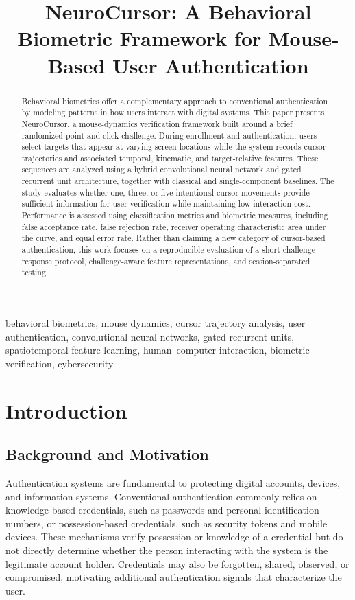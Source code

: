 \documentclass[conference]{IEEEtran}
\title{NeuroCursor: A Behavioral Biometric Framework for Mouse-Based User Authentication}
\author{
\IEEEauthorblockN{
Shaurya Saxena,
Chetan Gangireddy,
Shreehan Aalok Pathak,
and Hamid Abdul Mossa
}
\IEEEauthorblockA{
Department of Computer Science\\
The University of Texas at Dallas\\
Richardson, Texas, USA
}
}
\begin{document}
\maketitle

\begin{abstract}
Behavioral biometrics offer a complementary approach to conventional authentication by modeling patterns in how users interact with digital systems. This paper presents NeuroCursor, a mouse-dynamics verification framework built around a brief randomized point-and-click challenge. During enrollment and authentication, users select targets that appear at varying screen locations while the system records cursor trajectories and associated temporal, kinematic, and target-relative features. These sequences are analyzed using a hybrid convolutional neural network and gated recurrent unit architecture, together with classical and single-component baselines. The study evaluates whether one, three, or five intentional cursor movements provide sufficient information for user verification while maintaining low interaction cost. Performance is assessed using classification metrics and biometric measures, including false acceptance rate, false rejection rate, receiver operating characteristic area under the curve, and equal error rate. Rather than claiming a new category of cursor-based authentication, this work focuses on a reproducible evaluation of a short challenge-response protocol, challenge-aware feature representations, and session-separated testing.
\end{abstract}

\begin{IEEEkeywords}
behavioral biometrics, mouse dynamics, cursor trajectory analysis,
user authentication, convolutional neural networks, gated recurrent units,
spatiotemporal feature learning, human--computer interaction,
biometric verification, cybersecurity
\end{IEEEkeywords}

\section{Introduction}

\subsection{Background and Motivation}

Authentication systems are fundamental to protecting digital accounts,
devices, and information systems. Conventional authentication commonly
relies on knowledge-based credentials, such as passwords and personal
identification numbers, or possession-based credentials, such as security
tokens and mobile devices. These mechanisms verify possession or knowledge
of a credential but do not directly determine whether the person interacting
with the system is the legitimate account holder. Credentials may also be
forgotten, shared, observed, or compromised, motivating additional
authentication signals that characterize the user.
\end{document}
